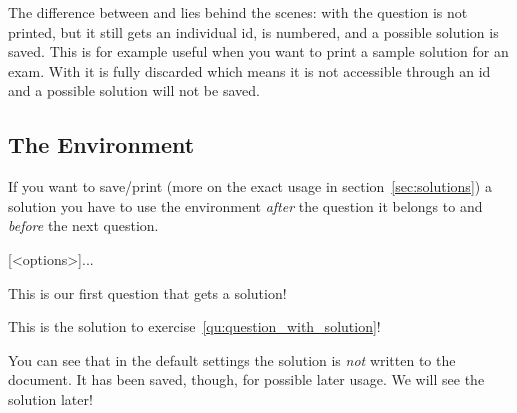 \documentclass[DIV10,toc=index,toc=bib,numbers=noendperiod]{cnpkgdoc}
\begin{document}
The difference between  and  lies behind the scenes: with
 the question is not printed, but it still gets an
individual \ac{id}, is numbered, and a possible solution is saved.  This is
for example useful when you want to print a sample solution for an exam.  With
 it is fully discarded which means it is not accessible
through an \acs{id} and a possible solution will not be saved.


\subsection{The  Environment}
If you want to save/print (more on the exact usage in
section~\ref{sec:solutions}) a solution you have to use the 
environment \emph{after} the question it belongs to and \emph{before} the next
question.
\begin{beschreibung}
  [<options>]{...}
\end{beschreibung}
\begin{beispiel}
 \begin{question}[ID=first]\label{qu:question_with_solution}
  This is our first question that gets a solution!
 \end{question}
 \begin{solution}
  This is the solution to exercise~\ref{qu:question_with_solution}!
 \end{solution}
\end{beispiel}
You can see that in the default settings the solution is \emph{not} written to
the document.  It has been saved, though, for possible later usage.  We will
see the solution later!
\end{document}
